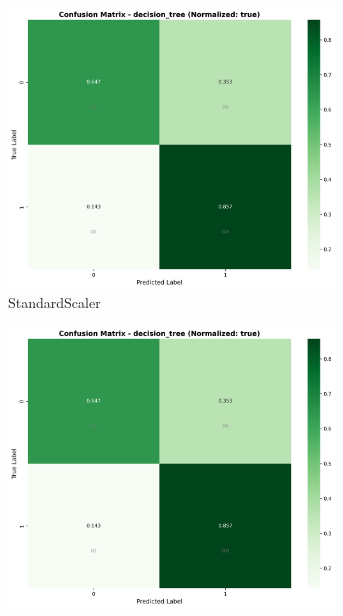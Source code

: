 \begin{figure}[H]
\centering
\begin{subfigure}[b]{0.31\textwidth}\centering
\includegraphics[width=0.95\textwidth]{Result/cleveland_dataset/confusion_matrices/decision_tree_numeric_dataset_StandardScaler.png}
\caption{StandardScaler}\label{fig:dt_clev_cm_standard}
\end{subfigure}\hfill
\begin{subfigure}[b]{0.31\textwidth}\centering
\includegraphics[width=0.95\textwidth]{Result/cleveland_dataset/confusion_matrices/decision_tree_numeric_dataset_MinMaxScaler.png}

\end{subfigure}
\end{figure}
